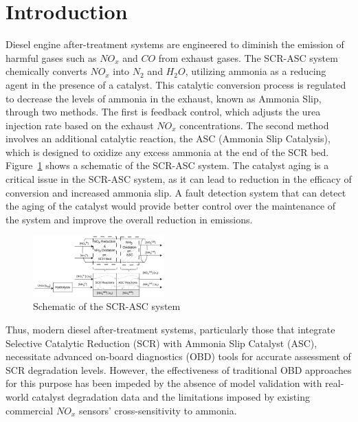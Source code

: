 \section{Introduction}

Diesel engine after-treatment systems are engineered to diminish the emission of
harmful gases such as $NO_x$ and $CO$ from exhaust gases. The SCR-ASC system
chemically converts $NO_x$ into $N_2$ and $H_2O$, utilizing ammonia as a reducing agent
in the presence of a catalyst. This catalytic conversion process is regulated to
decrease the levels of ammonia in the exhaust, known as Ammonia Slip, through
two methods. The first is feedback control, which adjusts the urea injection
rate based on the exhaust $NO_x$ concentrations. The second method involves an
additional catalytic reaction, the ASC (Ammonia Slip Catalysis), which is
designed to oxidize any excess ammonia at the end of the SCR bed.
Figure~\ref{fig:exhaust_scheme} shows a schematic of the SCR-ASC system. The
catalyst aging is a critical issue in the SCR-ASC system, as it can lead to
reduction in the efficacy of conversion and increased ammonia slip. A
fault detection system that can detect the aging of the catalyst would provide
better control over the maintenance of the system and improve the overall
reduction in emissions.

\begin{figure}[ht]
    \centering
    \includegraphics[width=0.45\textwidth]{./figs/scr_sys/SCR-ASC_model.png}
    \caption{Schematic of the SCR-ASC system}
    \label{fig:exhaust_scheme}
\end{figure}


Thus, modern diesel after-treatment systems, particularly those that integrate Selective Catalytic Reduction (SCR) with
Ammonia Slip Catalyst (ASC), necessitate advanced on-board diagnostics (OBD) tools for accurate assessment of SCR
degradation levels. However, the effectiveness of traditional OBD approaches for this purpose has been impeded by the
absence of model validation with real-world catalyst degradation data and the limitations imposed by existing commercial
$NO_x$ sensors' cross-sensitivity to ammonia.

